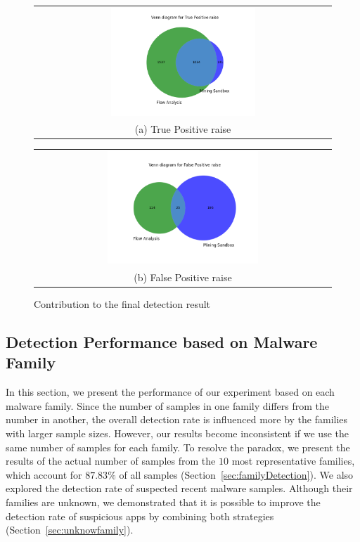 \begin{figure}[t!]
  \centering
  \begin{tabular}{@{}c@{}}
    \includegraphics[width=0.50\textwidth]{image/vennTP.png} \\[\abovecaptionskip]
    \small (a) True Positive raise
  \end{tabular}

  \begin{tabular}{@{}c@{}}
    \includegraphics[width=0.52\textwidth]{image/vennFP.png} \\[\abovecaptionskip]
    \small (b) False Positive raise
  \end{tabular}

  \caption{Contribution to the final detection result}\label{fig:venn}
\end{figure}






\subsection{Detection Performance based on Malware Family}\label{sec:family}

In this section, we present the performance of our experiment based on each malware family. Since the number of samples in one family differs from the number in another, the overall detection rate is influenced more by the families with larger sample sizes. However, our results become inconsistent if we use the same number of samples for each family. To resolve the paradox, we present the results of the actual number of samples from the $10$ most representative families, which account for $87.83\%$ of all samples (Section~\ref{sec:familyDetection}). We also explored the detection rate of suspected recent malware samples. Although their families are unknown, we demonstrated that it is possible to improve the detection rate of suspicious apps by combining both strategies (Section~\ref{sec:unknowfamily}).


